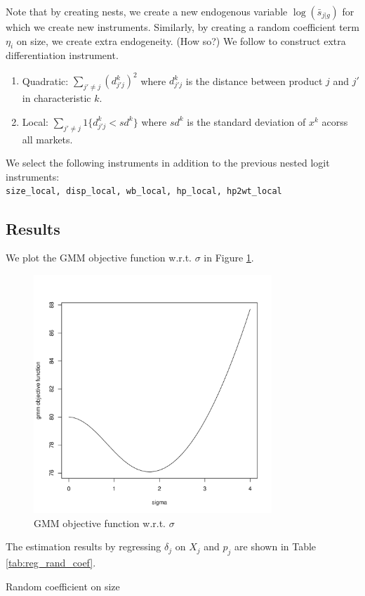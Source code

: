 \documentclass[12pt]{article}
\begin{document}
Note that by creating nests, we create a new endogenous variable
$\log(\bar{s}_{j|g})$ for which we create new instruments. Similarly, by
creating a random coefficient term $\eta_i$ on size, we create extra
endogeneity. (How so?) We follow \citep{houdeghandi2020} to construct extra
differentiation instrument.
\begin{enumerate}
    \item Quadratic: $\sum_{j' \neq j} (d_{j'j}^k)^2$ where $d_{j'j}^k$ is the distance
          between product $j$ and $j'$ in characteristic $k$.
    \item Local: $\sum_{j' \neq j} 1\{d_{j'j}^k < sd^k\}$ where $sd^k$ is the standard
          deviation of $x^k$ acorss all markets.
\end{enumerate}
We select the following instruments in addition to the previous nested logit instruments:\\
\verb|size_local, disp_local, wb_local, hp_local, hp2wt_local|
\subsection{Results}
We plot the GMM objective function w.r.t. $\sigma$ in Figure
\ref{fig:iv_local_diff}.
\begin{figure}[h!]
    \centering
    \includegraphics[width=0.8\textwidth]{../Results/Figures/gmm_obj_iv_local.pdf}
    \caption{GMM objective function w.r.t. $\sigma$}
    \label{fig:iv_local_diff}
\end{figure}
The estimation results by regressing $\delta_j$ on $X_j$ and $p_j$ are shown in Table \ref{tab:reg_rand_coef}.
\begin{table}[h!]\fontsize{10pt}{12pt}\selectfont
    \centering
    
    \caption{Random coefficient on size}
    \label{tab:reg_rand_coef}
\end{table}
\end{document}
